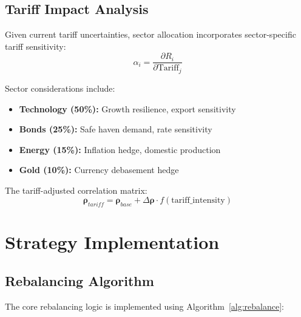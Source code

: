\documentclass[onecolumn,ieee]{arithmaxresearch}
\begin{document}
\subsection{Tariff Impact Analysis}

Given current tariff uncertainties, sector allocation incorporates sector-specific tariff sensitivity:
\begin{equation}
\alpha_i = \frac{\partial R_i}{\partial \text{Tariff}_j}
\end{equation}

Sector considerations include:
\begin{itemize}
    \item \textbf{Technology (50\%):} Growth resilience, export sensitivity
    \item \textbf{Bonds (25\%):} Safe haven demand, rate sensitivity  
    \item \textbf{Energy (15\%):} Inflation hedge, domestic production
    \item \textbf{Gold (10\%):} Currency debasement hedge
\end{itemize}

The tariff-adjusted correlation matrix:
\begin{equation}
\boldsymbol{\rho}_{tariff} = \boldsymbol{\rho}_{base} + \Delta \boldsymbol{\rho} \cdot f(\text{tariff\_intensity})
\end{equation}

\section{Strategy Implementation}

\subsection{Rebalancing Algorithm}

The core rebalancing logic is implemented using Algorithm~\ref{alg:rebalance}:
\end{document}
